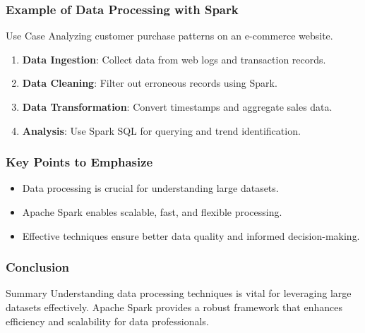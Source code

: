 \documentclass[aspectratio=169]{beamer}
\begin{document}
\begin{frame}[fragile]
    \frametitle{Example of Data Processing with Spark}
    \begin{block}{Use Case}
        Analyzing customer purchase patterns on an e-commerce website.
    \end{block}
    \begin{enumerate}
        \item \textbf{Data Ingestion}: Collect data from web logs and transaction records.
        \item \textbf{Data Cleaning}: Filter out erroneous records using Spark.
        \item \textbf{Data Transformation}: Convert timestamps and aggregate sales data.
        \item \textbf{Analysis}: Use Spark SQL for querying and trend identification.
    \end{enumerate}
\end{frame}

\begin{frame}[fragile]
    \frametitle{Key Points to Emphasize}
    \begin{itemize}
        \item Data processing is crucial for understanding large datasets.
        \item Apache Spark enables scalable, fast, and flexible processing.
        \item Effective techniques ensure better data quality and informed decision-making.
    \end{itemize}
\end{frame}

\begin{frame}[fragile]
    \frametitle{Conclusion}
    \begin{block}{Summary}
        Understanding data processing techniques is vital for leveraging large datasets effectively.
        Apache Spark provides a robust framework that enhances efficiency and scalability for data professionals.
    \end{block}
\end{frame}
\end{document}

